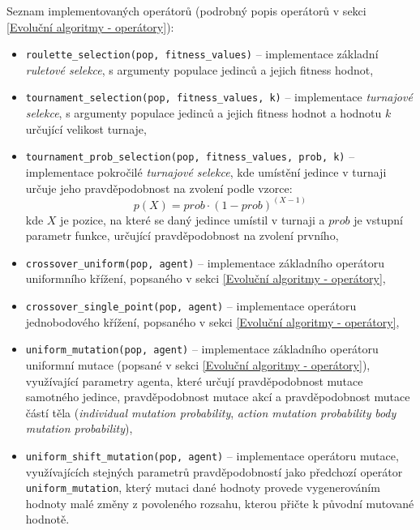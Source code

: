 Seznam implementovaných operátorů (podrobný popis operátorů v sekci
\ref{Evoluční algoritmy - operátory}):
\begin{itemize}
    \item \texttt{roulette\_selection(pop, fitness\_values)} -- implementace
        základní \linebreak \emph{ruletové selekce}, s argumenty populace
        jedinců a jejich fitness hodnot,
    \item \texttt{tournament\_selection(pop, fitness\_values, k)} --
        implementace \linebreak \emph{turnajové selekce}, s argumenty populace
        jedinců a jejich fitness hodnot a hodnotu $k$ určující velikost turnaje,
    \item \texttt{tournament\_prob\_selection(pop, fitness\_values, prob, k)}
        -- implementace pokročilé \emph{turnajové selekce}, kde umístění
        jedince v turnaji určuje jeho pravděpodobnost na zvolení podle vzorce:
        \begin{equation}
            p(X) = prob\cdot(1-prob)^{(X-1)}
        \end{equation}
        kde $X$ je pozice, na které se daný jedince umístil v turnaji a $prob$
        je vstupní parametr funkce, určující pravděpodobnost na zvolení prvního,
    \item \texttt{crossover\_uniform(pop, agent)} -- implementace základního
        operátoru uniformního křížení, popsaného v sekci \ref{Evoluční
        algoritmy - operátory},
    \item \texttt{crossover\_single\_point(pop, agent)} -- implementace
        operátoru jednobodového křížení, popsaného v sekci \ref{Evoluční
        algoritmy - operátory},
    \item \texttt{uniform\_mutation(pop, agent)} -- implementace základního
        operátoru uniformní mutace (popsané v sekci \ref{Evoluční algoritmy -
        operátory}), využívající parametry agenta, které určují pravděpodobnost
        mutace samotného jedince, pravděpodobnost mutace akcí a pravděpodobnost
        mutace částí těla (\emph{individual mutation probability}, \emph{action
        mutation probability} \emph{body mutation probability}),
    \item \texttt{uniform\_shift\_mutation(pop, agent)} -- implementace
        operátoru mutace, využívajících stejných parametrů pravděpodobností
        jako předchozí operátor \texttt{uniform\_mutation}, který mutaci dané
        hodnoty provede vygenerováním hodnoty malé změny z povoleného rozsahu,
        kterou přičte k původní mutované hodnotě.
\end{itemize}

